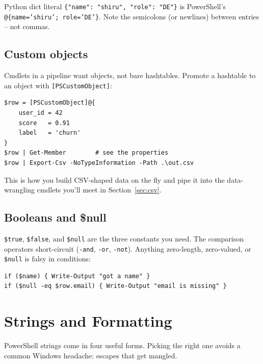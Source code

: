 \documentclass[11pt,a4paper]{article}
\begin{document}
\begin{compare}
Python dict literal \texttt{\{"name": "shiru", "role": "DE"\}} is
PowerShell's \texttt{@\{name='shiru'; role='DE'\}}. Note the
semicolons (or newlines) between entries -- not commas.
\end{compare}

\subsection*{Custom objects}

Cmdlets in a pipeline want objects, not bare hashtables. Promote a
hashtable to an object with \texttt{[PSCustomObject]}:

\begin{lstlisting}[style=pwshstyle]
$row = [PSCustomObject]@{
    user_id = 42
    score   = 0.91
    label   = 'churn'
}
$row | Get-Member        # see the properties
$row | Export-Csv -NoTypeInformation -Path .\out.csv
\end{lstlisting}

This is how you build CSV-shaped data on the fly and pipe it into the
data-wrangling cmdlets you'll meet in Section~\ref{sec:csv}.

\subsection*{Booleans and \$null}

\texttt{\$true}, \texttt{\$false}, and \texttt{\$null} are the three
constants you need. The comparison operators short-circuit (\texttt{-and},
\texttt{-or}, \texttt{-not}). Anything zero-length, zero-valued, or
\texttt{\$null} is falsy in conditions:

\begin{lstlisting}[style=pwshstyle]
if ($name) { Write-Output "got a name" }
if ($null -eq $row.email) { Write-Output "email is missing" }
\end{lstlisting}

\section{Strings and Formatting}

PowerShell strings come in four useful forms. Picking the right one
avoids a common Windows headache: escapes that get mangled.
\end{document}
